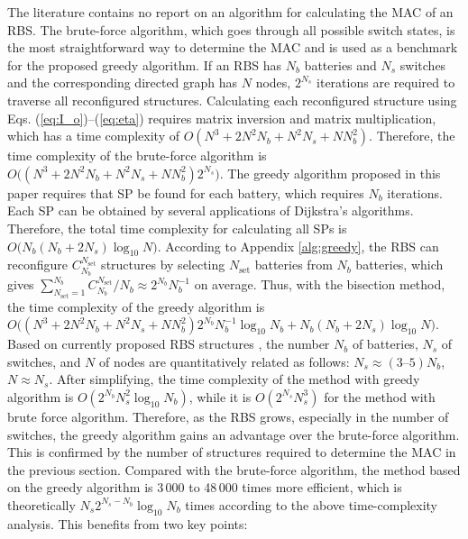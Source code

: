 \documentclass{article}
\begin{document}
The literature contains no report on an algorithm for calculating the MAC of an RBS.
The brute-force algorithm, which goes through all possible switch states, is the most straightforward way to determine the MAC and is used as a benchmark for the proposed greedy algorithm.
If an RBS has $N_b$ batteries and $N_s$ switches and the corresponding directed graph has $N$ nodes,  $2^{N_s}$ iterations are required to traverse all reconfigured structures.
Calculating each reconfigured structure using Eqs. (\ref{eq:I_o})--(\ref{eq:eta}) requires matrix inversion and matrix multiplication, which has a time complexity of $O(N^3+2N^2N_b+N^2N_s+NN^2_b)$.
Therefore, the time complexity of the brute-force algorithm is $O\bm((N^3+2N^2N_b+N^2N_s+NN^2_b)2^{N_s}\bm)$.
The greedy algorithm proposed in this paper requires  that SP be found for each battery, which requires $N_b$ iterations.
Each SP can be obtained by several applications of Dijkstra's algorithms.
Therefore, the total time complexity for calculating all SPs is $O\bm(N_b(N_b+2N_s)\log_{10} N\bm)$.
According to  Appendix \ref{alg:greedy}, the RBS can reconfigure $C^{N_{\text{set}}}_{N_b}$ structures by selecting $N_{\text{set}}$ batteries from $N_b$ batteries, which gives $\sum^{N_b}_{N_{\text{set}}=1}C^{N_{\text{set}}}_{N_b}/N_b \approx 2^{N_b} N_b^{-1}$ on average.
Thus, with the bisection method, the time complexity of the greedy algorithm is $O\bm((N^3+2N^2N_b+N^2N_s+NN^2_b) 2^{N_b} N_b^{-1} \log_{10} N_b+N_b(N_b+2N_s)\log_{10} N\bm)$.
Based on currently proposed RBS structures \cite{ciNovelDesignAdaptive2007,alahmadBatterySwitchArray2008,kimDependableEfficientScalable2010b,kimBalancedReconfigurationStorage2011a,taesickimSeriesconnectedSelfreconfigurableMulticell2012a,6843711}, the number $N_b$ of batteries, $N_s$ of switches, and $N$ of nodes are quantitatively related as follows: $N_s \approx (3\text{--} 5)N_b$, $N \approx N_s$. 
After simplifying, the time complexity of the method with greedy algorithm is $O(2^{N_b}N_s^2\log_{10} N_b)$, while it is $O(2^{N_s}N_s^3)$ for the method with brute force algorithm.
Therefore, as the RBS grows, especially in the number of switches, the greedy algorithm gains an advantage over the brute-force algorithm.
This is confirmed by the number of structures required to determine the MAC in the previous section. 
Compared with the brute-force algorithm, the method based on the greedy algorithm is 3\,000 to 48\,000 times more efficient, which is theoretically $N_s 2^{N_s - N_b} \log_{10} N_b$ times according to the above time-complexity analysis.
This benefits from two key points:
\end{document}
